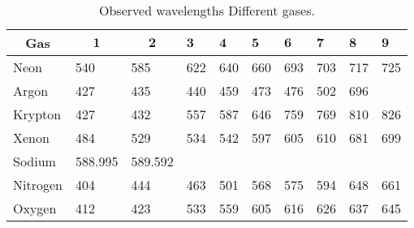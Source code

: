 \begin{table}
    \begin{adjustbox}{width=1\textwidth, center}
        \begin{tabular}{|l|l|l|l|l|l|l|l|l|l|}
            \hline \multicolumn{1}{|c|}{ Gas } & \multicolumn{1}{|c|}{$\mathbf{1}$} & \multicolumn{1}{c|}{$\mathbf{2}$} & $\mathbf{3}$ & $\mathbf{4}$ & $\mathbf{5}$ & $\mathbf{6}$ & $\mathbf{7}$ & $\mathbf{8}$ & $\mathbf{9}$ \\
            \hline Neon                        & 540                                & 585                               & 622          & 640          & 660          & 693          & 703          & 717          & 725          \\
            \hline Argon                       & 427                                & 435                               & 440          & 459          & 473          & 476          & 502          & 696          &              \\
            \hline Krypton                     & 427                                & 432                               & 557          & 587          & 646          & 759          & 769          & 810          & 826          \\
            \hline Xenon                       & 484                                & 529                               & 534          & 542          & 597          & 605          & 610          & 681          & 699          \\
            \hline Sodium                      & 588.995                            & 589.592                           &              &              &              &              &              &              &              \\
            \hline Nitrogen                    & 404                                & 444                               & 463          & 501          & 568          & 575          & 594          & 648          & 661          \\
            \hline Oxygen                      & 412                                & 423                               & 533          & 559          & 605          & 616          & 626          & 637          & 645          \\
            \hline
        \end{tabular}
    \end{adjustbox}
    \caption{Observed wavelengths Different gases.}
    \label{tab:differentGases}
\end{table}

